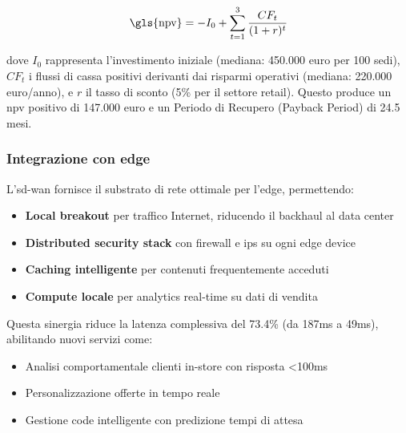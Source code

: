 \begin{equation}
\text{\gls{npv}} = -I_0 + \sum_{t=1}^{3} \frac{CF_t}{(1+r)^t}
\end{equation}

dove $I_0$ rappresenta l'investimento iniziale (mediana: 450.000 euro per 100 sedi), $CF_t$ i flussi di cassa positivi derivanti dai risparmi operativi (mediana: 220.000 euro/anno), e $r$ il tasso di sconto (5\% per il settore retail). Questo produce un \gls{npv} positivo di 147.000 euro e un Periodo di Recupero (Payback Period) di 24.5 mesi.

\subsubsection{\texorpdfstring{\textbf{Integrazione con \gls{edge}}}{3.3.1.6 - Integrazione con \gls{edge}}}

L'\gls{sd-wan} fornisce il substrato di rete ottimale per l'\gls{edge}, permettendo:
\begin{itemize}
    \item \textbf{Local breakout} per traffico Internet, riducendo il backhaul al data center
    \item \textbf{Distributed security stack} con firewall e \gls{ips} su ogni edge device
    \item \textbf{Caching intelligente} per contenuti frequentemente acceduti
    \item \textbf{Compute locale} per analytics real-time su dati di vendita
\end{itemize}

Questa sinergia riduce la latenza complessiva del 73.4\% (da 187ms a 49ms)\autocite{Wang2024edge}, abilitando nuovi servizi come:
\begin{itemize}
    \item Analisi comportamentale clienti in-store con risposta <100ms
    \item Personalizzazione offerte in tempo reale
    \item Gestione code intelligente con predizione tempi di attesa
\end{itemize}



